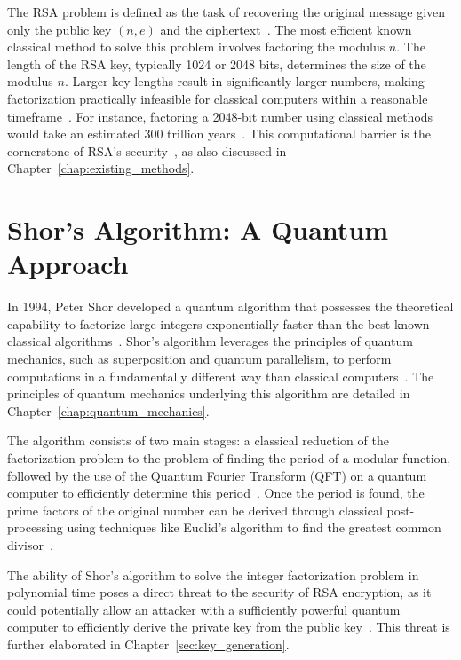 \documentclass[12pt,a4paper]{report}
\begin{document}
The RSA problem is defined as the task of recovering the original message given only the public key \((n, e)\) and the ciphertext~\cite{RSAWiki}. The most efficient known classical method to solve this problem involves factoring the modulus \(n\). The length of the RSA key, typically 1024 or 2048 bits, determines the size of the modulus \(n\). Larger key lengths result in significantly larger numbers, making factorization practically infeasible for classical computers within a reasonable timeframe~\cite{SecureW2}. For instance, factoring a 2048-bit number using classical methods would take an estimated 300 trillion years~\cite{ODUCommons}. This computational barrier is the cornerstone of RSA's security~\cite{SoftwareDominos}, as also discussed in Chapter~\ref{chap:existing_methods}.

\section{Shor's Algorithm: A Quantum Approach}
In 1994, Peter Shor developed a quantum algorithm that possesses the theoretical capability to factorize large integers exponentially faster than the best-known classical algorithms~\cite{SpinQShor}. Shor's algorithm leverages the principles of quantum mechanics, such as superposition and quantum parallelism, to perform computations in a fundamentally different way than classical computers~\cite{AuthoreaImplementation}. The principles of quantum mechanics underlying this algorithm are detailed in Chapter~\ref{chap:quantum_mechanics}.

The algorithm consists of two main stages: a classical reduction of the factorization problem to the problem of finding the period of a modular function, followed by the use of the Quantum Fourier Transform (QFT) on a quantum computer to efficiently determine this period~\cite{SpinQShor}. Once the period is found, the prime factors of the original number can be derived through classical post-processing using techniques like Euclid's algorithm to find the greatest common divisor~\cite{TechRxivImplementation}.

The ability of Shor's algorithm to solve the integer factorization problem in polynomial time poses a direct threat to the security of RSA encryption, as it could potentially allow an attacker with a sufficiently powerful quantum computer to efficiently derive the private key from the public key~\cite{SpinQShor}. This threat is further elaborated in Chapter~\ref{sec:key_generation}.
\end{document}
